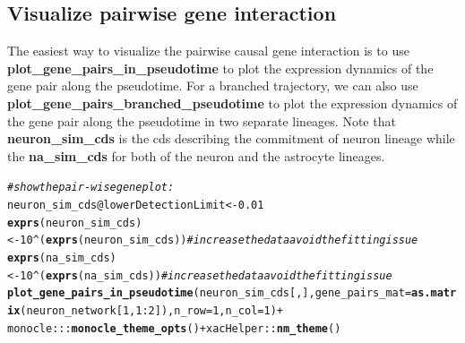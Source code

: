 \documentclass[10pt,oneside]{article}\usepackage[]{graphicx}\usepackage[]{color}
\makeatletter
\newcommand{\hlnum}[1]{\textcolor[rgb]{0.686,0.059,0.569}{#1}}%
\newcommand{\hlcom}[1]{\textcolor[rgb]{0.678,0.584,0.686}{\textit{#1}}}%
\newcommand{\hlopt}[1]{\textcolor[rgb]{0,0,0}{#1}}%
\newcommand{\hlstd}[1]{\textcolor[rgb]{0.345,0.345,0.345}{#1}}%
\newcommand{\hlkwb}[1]{\textcolor[rgb]{0.69,0.353,0.396}{#1}}%
\newcommand{\hlkwc}[1]{\textcolor[rgb]{0.333,0.667,0.333}{#1}}%
\newcommand{\hlkwd}[1]{\textcolor[rgb]{0.737,0.353,0.396}{\textbf{#1}}}%
\newenvironment{kframe}{%
 \def\at@end@of@kframe{}%
 \ifinner\ifhmode%
  \def\at@end@of@kframe{\end{minipage}}%
  \begin{minipage}{\columnwidth}%
 \fi\fi%
 \def\FrameCommand##1{\hskip\@totalleftmargin \hskip-\fboxsep
 \colorbox{shadecolor}{##1}\hskip-\fboxsep
     \hskip-\linewidth \hskip-\@totalleftmargin \hskip\columnwidth}%
 \MakeFramed {\advance\hsize-\width
   \@totalleftmargin\z@ \linewidth\hsize
   \@setminipage}}%
 {\par\unskip\endMakeFramed%
 \at@end@of@kframe}
\newenvironment{knitrout}{}{} %
\makeatother
\begin{document}
\subsection{Visualize pairwise gene interaction}

The easiest way to visualize the pairwise causal gene interaction is to use \textbf{plot\_gene\_pairs\_in\_pseudotime} to plot the expression dynamics of the gene pair along the pseudotime. For a branched trajectory, we can also use \textbf{plot\_gene\_pairs\_branched\_pseudotime} to plot the expression dynamics of the gene pair along the pseudotime in two separate lineages. Note that \textbf{neuron\_sim\_cds} is the cds describing the commitment of neuron lineage while the \textbf{na\_sim\_cds} for both of the neuron and the astrocyte lineages. 
\begin{knitrout}
\color{fgcolor}\begin{kframe}
\begin{alltt}
\hlcom{# show the pair-wise gene plot:   }
\hlstd{neuron_sim_cds}\hlopt{@}\hlkwc{lowerDetectionLimit} \hlkwb{<-} \hlnum{0.01}
\hlkwd{exprs}\hlstd{(neuron_sim_cds)} \hlkwb{<-} \hlnum{10}\hlopt{^}\hlstd{(}\hlkwd{exprs}\hlstd{(neuron_sim_cds))} \hlcom{#increase the data avoid the fitting issue}
\hlkwd{exprs}\hlstd{(na_sim_cds)} \hlkwb{<-} \hlnum{10}\hlopt{^}\hlstd{(}\hlkwd{exprs}\hlstd{(na_sim_cds))} \hlcom{#increase the data avoid the fitting issue}
\hlkwd{plot_gene_pairs_in_pseudotime}\hlstd{(neuron_sim_cds[, ],} \hlkwc{gene_pairs_mat} \hlstd{=}  \hlkwd{as.matrix}\hlstd{(neuron_network[}\hlnum{1}\hlstd{,} \hlnum{1}\hlopt{:}\hlnum{2}\hlstd{]),} \hlkwc{n_row} \hlstd{=} \hlnum{1}\hlstd{,} \hlkwc{n_col} \hlstd{=} \hlnum{1}\hlstd{)} \hlopt{+}
  \hlstd{monocle}\hlopt{:::}\hlkwd{monocle_theme_opts}\hlstd{()} \hlopt{+} \hlstd{xacHelper}\hlopt{::}\hlkwd{nm_theme}\hlstd{()}
\end{alltt}


{\ttfamily\noindent\itshape\color{messagecolor}{\#\# gene\_name is Pax6}}

{\ttfamily\noindent\itshape\color{messagecolor}{\#\# inflection\_point is 171.5}}

{\ttfamily\noindent\itshape\color{messagecolor}{\#\# gene\_name is Tuj1}}

{\ttfamily\noindent\itshape\color{messagecolor}{\#\# inflection\_point is 238}}\end{kframe}


\end{knitrout}
\end{document}

